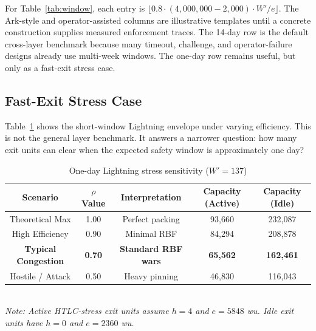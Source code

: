 \documentclass{article}
\theoremstyle{definition}
\begin{document}
\begin{table}[h]
\centering
\caption{Exit capacity by enforcement window ($\rho=0.8$)}\label{tab:window}
\end{table}

For Table~\ref{tab:window}, each entry is $\lfloor 0.8 \cdot (4{,}000{,}000-2{,}000) \cdot W' / e \rfloor$. The Ark-style and operator-assisted columns are illustrative templates until a concrete construction supplies measured enforcement traces. The 14-day row is the default cross-layer benchmark because many timeout, challenge, and operator-failure designs already use multi-week windows. The one-day row remains useful, but only as a fast-exit stress case.

\subsection{Fast-Exit Stress Case}
Table~\ref{tab:rho} shows the short-window Lightning envelope under varying efficiency. This is not the general layer benchmark. It answers a narrower question: how many exit units can clear when the expected safety window is approximately one day?

\begin{table}[h]
\centering
\caption{One-day Lightning stress sensitivity ($W'=137$)}\label{tab:rho}
\begin{tabular}{@{}ccccc@{}}
\toprule
Scenario & $\rho$ Value & Interpretation & Capacity (Active) & Capacity (Idle) \\
\midrule
Theoretical Max & 1.00 & Perfect packing & 93,660 & 232,087 \\
High Efficiency & 0.90 & Minimal RBF & 84,294 & 208,878 \\
\textbf{Typical Congestion} & \textbf{0.70} & \textbf{Standard RBF wars} & \textbf{65,562} & \textbf{162,461} \\
Hostile / Attack & 0.50 & Heavy pinning & 46,830 & 116,043 \\
\bottomrule
\end{tabular}
\footnotesize{\\ \emph{Note: Active HTLC-stress exit units assume $h=4$ and $e=5848$ wu. Idle exit units have $h=0$ and $e=2360$ wu.}}
\end{table}
\end{document}
